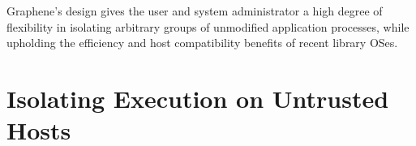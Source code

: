 \begin{comment}
The contributions of this paper are:
\begin{compactitem}
\item \sysname{}, a Linux library OS, which supports
  real-world, multi-process applications including a shell, web server,
  and compiler, which can be  efficiently checkpointed and migrated.
\item A framework for implementing multi-process APIs across cooperating library OS instances.
\item A thorough evaluation of the overheads of \sysname{}.  Memory footprints are an order of magnitude
smaller than KVM, and several applications perform comparably to a Linux process.
\item A thorough analysis of \sysname{} security isolation.


\end{compactitem}
\end{comment}

Graphene's design gives the user and system administrator a high degree of flexibility
in isolating arbitrary groups of unmodified application processes,
while upholding the efficiency and host compatibility benefits of recent library OSes.


\section{Isolating Execution on Untrusted Hosts}
\label{sec:intro:graphene-sgx}



